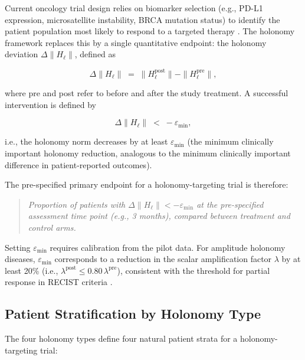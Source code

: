 Current oncology trial design relies on biomarker selection (e.g., PD-L1
expression, microsatellite instability, BRCA mutation status) to identify
the patient population most likely to respond to a targeted therapy
\citep{Simon2010}.  The holonomy framework replaces this by a single
quantitative endpoint: the holonomy deviation $\Delta\|H_\ell\|$, defined as

\begin{equation}
  \label{eq:ch10-holonomy-endpoint}
  \Delta\|H_\ell\| \;=\; \|H_\ell^{\mathrm{post}}\| - \|H_\ell^{\mathrm{pre}}\|,
\end{equation}

\noindent where pre and post refer to before and after the study treatment.
A successful intervention is defined by

\begin{equation}
  \label{eq:ch10-endpoint-criterion}
  \Delta\|H_\ell\| \;<\; -\varepsilon_{\mathrm{min}},
\end{equation}

\noindent i.e., the holonomy norm decreases by at least $\varepsilon_{\mathrm{min}}$
(the minimum clinically important holonomy reduction, analogous to the minimum
clinically important difference in patient-reported outcomes).

The pre-specified primary endpoint for a holonomy-targeting trial is therefore:

\begin{quote}
\emph{Proportion of patients with $\Delta\|H_\ell\| < -\varepsilon_{\mathrm{min}}$
at the pre-specified assessment time point (e.g., 3 months), compared between
treatment and control arms.}
\end{quote}

\begin{remark}
Setting $\varepsilon_{\mathrm{min}}$ requires calibration from the pilot data.
For amplitude holonomy diseases, $\varepsilon_{\mathrm{min}}$ corresponds to a
reduction in the scalar amplification factor $\lambda$ by at least 20\% (i.e.,
$\lambda^{\mathrm{post}} \leq 0.80\, \lambda^{\mathrm{pre}}$), consistent with
the threshold for partial response in RECIST criteria \citep{Eisenhauer2009}.
\end{remark}

\subsection{Patient Stratification by Holonomy Type}

The four holonomy types define four natural patient strata for a
holonomy-targeting trial:

